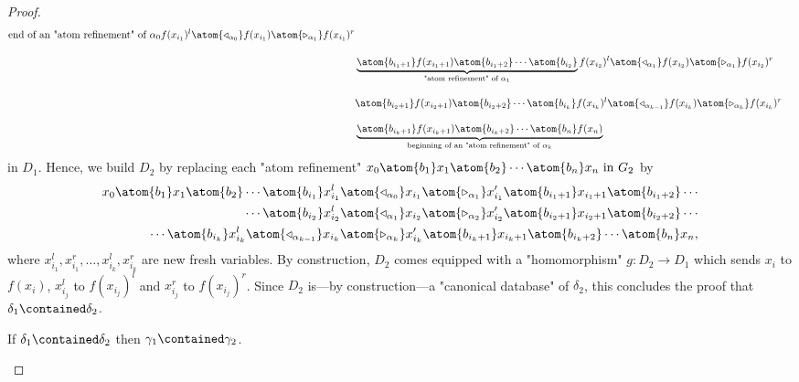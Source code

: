 \begin{proof}
\begin{align*}
{			\text{end of an "atom refinement" of $\alpha_0$}
		}
		f(x_{i_1})^l \atom{\triangleleft_{\alpha_{0}}} f(x_{i_1}) \atom{\triangleright_{\alpha_{1}}} f(x_{i_1})^r
		\\[1em]
		& \underbrace{\atom{b_{i_1+1}} f(x_{i_{1}+1}) \atom{b_{i_1+2}} \cdots \atom{b_{i_2}}}_{
			\text{"atom refinement" of $\alpha_1$}
		}
		f(x_{i_2})^l 
		\atom{\triangleleft_{\alpha_{1}}} f(x_{i_2}) \atom{\triangleright_{\alpha_{1}}} f(x_{i_2})^r \\[1em]
		& \atom{b_{i_2+1}} f(x_{i_{2}+1}) \atom{b_{i_2+2}} \cdots
		\atom{b_{i_k}}
		f(x_{i_k})^l \atom{\triangleleft_{\alpha_{k-1}}} f(x_{i_k}) \atom{\triangleright_{\alpha_{k}}} f(x_{i_k})^r \\[1em]
		& \underbrace{\atom{b_{i_k+1}} f(x_{i_{k}+1}) \atom{b_{i_k+2}} \cdots \atom{b_n} f(x_n)}_{
			\text{beginning of an "atom refinement" of $\alpha_k$}
		}
	\end{align*}
	in $D_1$. Hence, we build $D_2$ by replacing each "atom refinement"
	$
		x_0 \atom{b_1} x_1 \atom{b_2} \cdots \atom{b_n} x_n
		\text{ in } G_2
	$
	by
	\begin{align*}
		x_0 \atom{b_1} x_1 \atom{b_2} \cdots \atom{b_{i_1}}
		x_{i_1}^l \atom{\triangleleft_{\alpha_0}} x_{i_1} \atom{\triangleright_{\alpha_{1}}} x_{i_1}'
		\atom{b_{i_1+1}} x_{i_{1}+1} \atom{b_{i_1+2}} \cdots \\
		\cdots \atom{b_{i_2}}
		x_{i_2}^l \atom{\triangleleft_{\alpha_1}} x_{i_2} \atom{\triangleright_{\alpha_{2}}} x_{i_2}'
		\atom{b_{i_2+1}} x_{i_{2}+1} \atom{b_{i_2+2}} \cdots \\
		\cdots \atom{b_{i_k}}
		x_{i_k}^l \atom{\triangleleft_{\alpha_{k-1}}} x_{i_k} \atom{\triangleright_{\alpha_{k}}} x_{i_k}'
		\atom{b_{i_k+1}} x_{i_{k}+1} \atom{b_{i_k+2}} \cdots \atom{b_n} x_n,
	\end{align*}
	where $x_{i_1}^l, x_{i_1}^r, \dotsc, x_{i_k}^l, x_{i_k}^r$ are new fresh variables.
	By construction, $D_2$ comes equipped with a "homomorphism" 
	$g\colon D_2 \to D_1$ which sends $x_i$ to $f(x_i)$,
	$x_{i_j}^l$ to $f(x_{i_j})^l$ and $x_{i_j}^r$ to $f(x_{i_j})^r$. Since $D_2$ is---by
	construction---a "canonical database" of $\delta_2$, this concludes the proof that 
	$\delta_1 \contained \delta_2$.

	\begin{claim}
		\AP\label{claim:canonization-multigraph-monotonic-r-to-l}
		If $\delta_1 \contained \delta_2$ then $\gamma_1 \contained \gamma_2$.
	\end{claim}


\end{proof}
